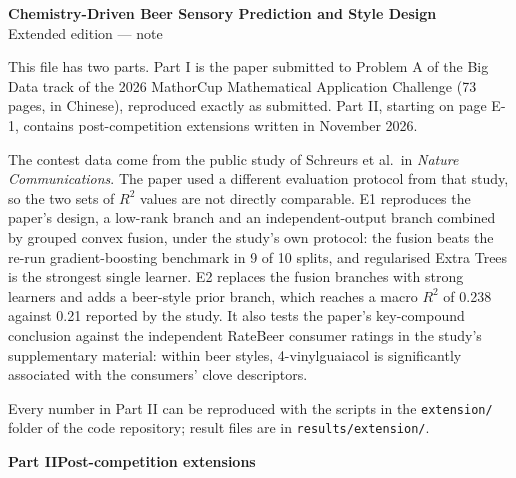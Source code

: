 
\graphicspath{{../../figures/extension/}}

\thispagestyle{empty}
\begin{center}
{\Large\bfseries Chemistry-Driven Beer Sensory Prediction and Style Design}\\[0.7em]
{\large Extended edition --- note}
\end{center}
\vspace{0.8em}

This file has two parts. Part I is the paper submitted to Problem A of the Big Data track of the 2026 MathorCup Mathematical Application Challenge (73 pages, in Chinese), reproduced exactly as submitted. Part II, starting on page E-1, contains post-competition extensions written in November 2026.

The contest data come from the public study of Schreurs et al.\ in \emph{Nature Communications}. The paper used a different evaluation protocol from that study, so the two sets of $R^2$ values are not directly comparable. E1 reproduces the paper's design, a low-rank branch and an independent-output branch combined by grouped convex fusion, under the study's own protocol: the fusion beats the re-run gradient-boosting benchmark in 9 of 10 splits, and regularised Extra Trees is the strongest single learner. E2 replaces the fusion branches with strong learners and adds a beer-style prior branch, which reaches a macro $R^2$ of 0.238 against 0.21 reported by the study. It also tests the paper's key-compound conclusion against the independent RateBeer consumer ratings in the study's supplementary material: within beer styles, 4-vinylguaiacol is significantly associated with the consumers' clove descriptors.

Every number in Part II can be reproduced with the scripts in the \texttt{extension/} folder of the code repository; result files are in \texttt{results/extension/}.

\clearpage
{}

\setcounter{page}{1}
\begin{center}{\Large\bfseries Part II\quad Post-competition extensions}\end{center}

